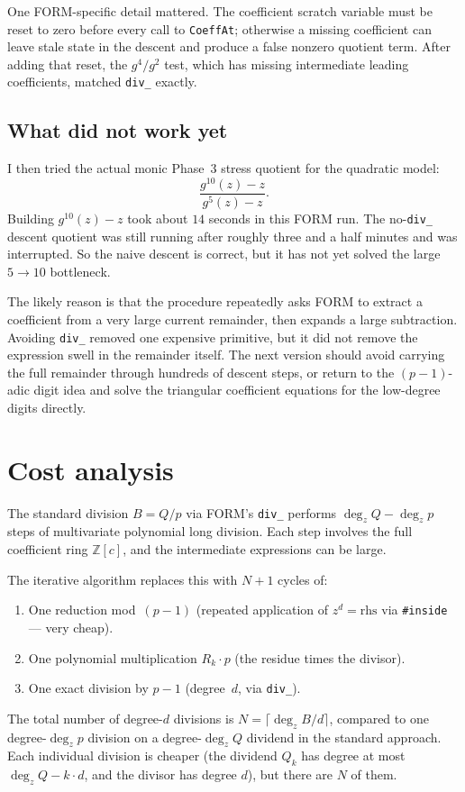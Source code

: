 \documentclass[11pt]{article}
\begin{document}
One FORM-specific detail mattered.  The coefficient scratch variable must be reset to
zero before every call to \texttt{CoeffAt}; otherwise a missing coefficient can leave
stale state in the descent and produce a false nonzero quotient term.  After adding
that reset, the $g^4/g^2$ test, which has missing intermediate leading coefficients,
matched \texttt{div\_} exactly.

\subsection{What did not work yet}

I then tried the actual monic Phase~3 stress quotient for the quadratic model:
\[
\frac{g^{10}(z)-z}{g^5(z)-z}.
\]
Building $g^{10}(z)-z$ took about $14$ seconds in this FORM run.  The no-\texttt{div\_}
descent quotient was still running after roughly three and a half minutes and was
interrupted.  So the naive descent is correct, but it has not yet solved the large
$5\to10$ bottleneck.

The likely reason is that the procedure repeatedly asks FORM to extract a coefficient
from a very large current remainder, then expands a large subtraction.  Avoiding
\texttt{div\_} removed one expensive primitive, but it did not remove the expression
swell in the remainder itself.  The next version should avoid carrying the full
remainder through hundreds of descent steps, or return to the $(p-1)$-adic digit idea
and solve the triangular coefficient equations for the low-degree digits directly.

\section{Cost analysis}
\label{sec:cost}

The standard division $B=Q/p$ via FORM's \texttt{div\_} performs
$\deg_z Q-\deg_z p$ steps of multivariate polynomial long division.  Each
step involves the full coefficient ring $\mathbb{Z}[c]$, and the
intermediate expressions can be large.

The iterative algorithm replaces this with $N+1$ cycles of:
\begin{enumerate}
\item One reduction mod~$(p{-}1)$ (repeated application of
      $z^d=\text{rhs}$ via \texttt{\#inside} --- very cheap).
\item One polynomial multiplication $R_k\cdot p$ (the residue times the
      divisor).
\item One exact division by $p-1$ (degree~$d$, via \texttt{div\_}).
\end{enumerate}
The total number of degree-$d$ divisions is $N=\lceil\deg_z B/d\rceil$,
compared to one degree-$\deg_z p$ division on a degree-$\deg_z Q$ dividend
in the standard approach.  Each individual division is cheaper (the
dividend $Q_k$ has degree at most $\deg_z Q-k\cdot d$, and the divisor has
degree $d$), but there are $N$ of them.
\end{document}
